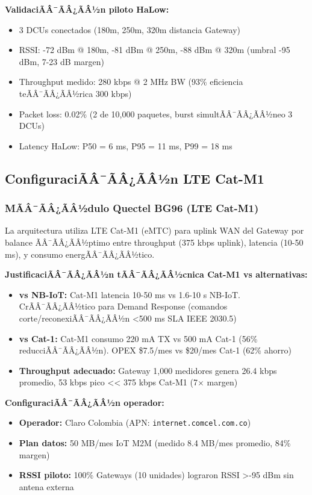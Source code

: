 \textbf{ValidaciÃÂ¯ÃÂ¿ÃÂ½n piloto HaLow:}

\begin{itemize}
    \item 3 DCUs conectados (180m, 250m, 320m distancia Gateway)
    \item RSSI: -72 dBm @ 180m, -81 dBm @ 250m, -88 dBm @ 320m (umbral -95 dBm, 7-23 dB margen)
    \item Throughput medido: 280 kbps @ 2 MHz BW (93\% eficiencia teÃÂ¯ÃÂ¿ÃÂ½rica 300 kbps)
    \item Packet loss: 0.02\% (2 de 10,000 paquetes, burst simultÃÂ¯ÃÂ¿ÃÂ½neo 3 DCUs)
    \item Latency HaLow: P50 = 6 ms, P95 = 11 ms, P99 = 18 ms
\end{itemize}

\subsection{ConfiguraciÃÂ¯ÃÂ¿ÃÂ½n LTE Cat-M1}
\label{sec:impl-config-lte}

\subsubsection{MÃÂ¯ÃÂ¿ÃÂ½dulo Quectel BG96 (LTE Cat-M1)}

La arquitectura utiliza LTE Cat-M1 (eMTC) para uplink WAN del Gateway por balance ÃÂ¯ÃÂ¿ÃÂ½ptimo entre throughput (375 kbps uplink), latencia (10-50 ms), y consumo energÃÂ¯ÃÂ¿ÃÂ½tico.

\textbf{JustificaciÃÂ¯ÃÂ¿ÃÂ½n tÃÂ¯ÃÂ¿ÃÂ½cnica Cat-M1 vs alternativas:}

\begin{itemize}
    \item \textbf{vs NB-IoT:} Cat-M1 latencia 10-50 ms vs 1.6-10 s NB-IoT. CrÃÂ¯ÃÂ¿ÃÂ½tico para Demand Response (comandos corte/reconexiÃÂ¯ÃÂ¿ÃÂ½n <500 ms SLA IEEE 2030.5)
    \item \textbf{vs Cat-1:} Cat-M1 consumo 220 mA TX vs 500 mA Cat-1 (56\% reducciÃÂ¯ÃÂ¿ÃÂ½n). OPEX \$7.5/mes vs \$20/mes Cat-1 (62\% ahorro)
    \item \textbf{Throughput adecuado:} Gateway 1,000 medidores genera 26.4 kbps promedio, 53 kbps pico << 375 kbps Cat-M1 (7$\times$ margen)
\end{itemize}

\textbf{ConfiguraciÃÂ¯ÃÂ¿ÃÂ½n operador:}

\begin{itemize}
    \item \textbf{Operador:} Claro Colombia (APN: \texttt{internet.comcel.com.co})
    \item \textbf{Plan datos:} 50 MB/mes IoT M2M (medido 8.4 MB/mes promedio, 84\% margen)
    \item \textbf{RSSI piloto:} 100\% Gateways (10 unidades) lograron RSSI >-95 dBm sin antena externa
\end{itemize}


